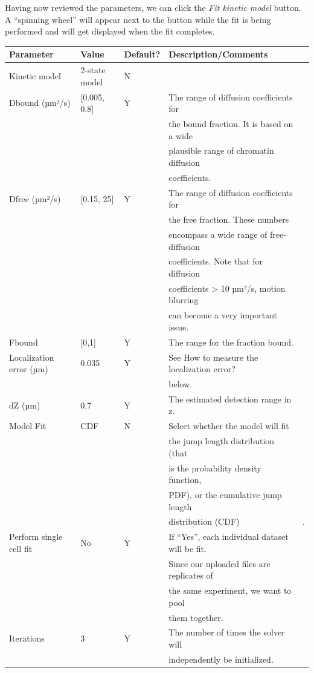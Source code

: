 Having now reviewed the parameters, we can click the \textit{Fit kinetic model} button. A ``spinning wheel'' will appear next to the button while the fit is being performed and will get displayed when the fit completes.

\begin{center}
  \label{table:table5}
\begin{tabular}{lllll}
Parameter & Value & Default? & Description/Comments & \\
\hline
Kinetic model & 2-state model & N &  & \\
Dbound (µm²/s) & [0.005, 0.8] & Y & The range of diffusion coefficients for\\&&&
the bound fraction. It is based on a wide \\&&&
plausible range of chromatin diffusion \\&&&
coefficients. & \\
Dfree (µm²/s) & [0.15, 25] & Y &
The range of diffusion coefficients for \\&&&
the free fraction. These numbers \\&&&
encompass a wide range of free-diffusion \\&&&
coefficients. Note that for diffusion \\&&&
coefficients > 10 µm²/s, motion blurring \\&&&
can become a very important issue. & \\
Fbound & [0,1] & Y & The range for the fraction bound. & \\
Localization error (µm) & 0.035 & Y & See How to measure the localization error?\\&&& below. & \\
dZ (µm) & 0.7 & Y & The estimated detection range in z. & \\
Model Fit & CDF & N &
Select whether the model will fit \\&&&
the jump length distribution (that \\&&&
is the probability density function, \\&&&
PDF), or the cumulative jump length \\&&&
distribution (CDF) & .\\
Perform single cell fit & No & Y &
If ``Yes'', each individual dataset will be fit.\\&&&
Since our uploaded files are replicates of \\&&&
the same experiment, we want to pool \\&&&
them together. & \\
Iterations & 3 & Y & The number of times the solver will\\&&& independently be initialized. & \\
\end{tabular}
\end{center}

